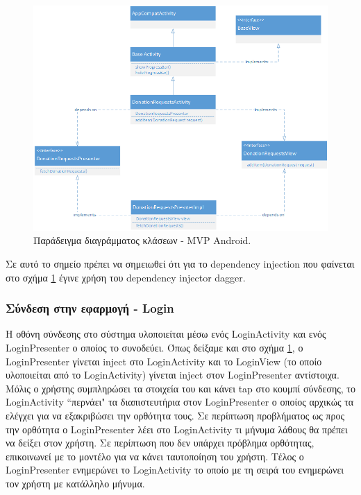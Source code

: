	\begin{figure}[h]
	    \centering
	    \includegraphics[width=1.1\textwidth]{android_mvp_example_class_diagram.png}
	    \caption{Παράδειγμα διαγράμματος κλάσεων - MVP Android.}
	    \label{fig:android_mvp_example_class_diagram}
	\end{figure}
	
	Σε αυτό το σημείο πρέπει να σημειωθεί ότι για το dependency injection που φαίνεται στο σχήμα \ref{fig:android_mvp_example_class_diagram} έγινε χρήση του dependency injector dagger\cite{daggerAndroid}. 
	
   		\subsubsection{Σύνδεση στην εφαρμογή - Login}
   		
   		Η οθόνη σύνδεσης στο σύστημα υλοποιείται μέσω ενός LoginActivity και ενός LoginPresenter ο οποίος το συνοδεύει. Όπως δείξαμε και στο σχήμα \ref{fig:android_mvp_example_class_diagram}, ο LoginPresenter γίνεται inject στο LoginActivity και το LoginView (το οποίο υλοποιείται από το LoginActivity) γίνεται inject στον LoginPresenter αντίστοιχα. Μόλις ο χρήστης συμπληρώσει τα στοιχεία του και κάνει tap στο κουμπί σύνδεσης, το LoginActivity ``περνάει" τα διαπιστευτήρια στον LoginPresenter ο οποίος αρχικώς τα ελέγχει για να εξακριβώσει την ορθότητα τους. Σε περίπτωση προβλήματος ως προς την ορθότητα ο LoginPresenter λέει στο LoginActivity τι μήνυμα λάθους θα πρέπει να δείξει στον χρήστη. Σε περίπτωση που δεν υπάρχει πρόβλημα ορθότητας, επικοινωνεί με το μοντέλο για να κάνει ταυτοποίηση του χρήστη. Τέλος ο LoginPresenter ενημερώνει το LoginActivity το οποίο με τη σειρά του ενημερώνει τον χρήστη με κατάλληλο μήνυμα. 
   		
